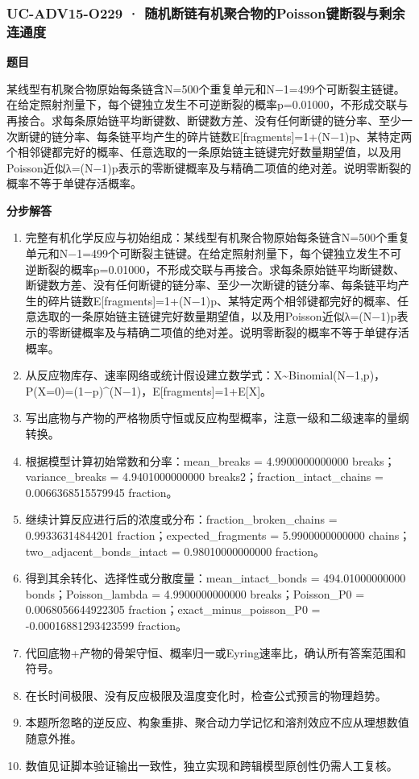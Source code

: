 \documentclass[UTF8,11pt,a4paper]{ctexart}
\begin{document}
\subsubsection*{UC-ADV15-O229 · 随机断链有机聚合物的Poisson键断裂与剩余连通度}
\noindent\textbf{题目}\par
某线型有机聚合物原始每条链含N=500个重复单元和N−1=499个可断裂主链键。在给定照射剂量下，每个键独立发生不可逆断裂的概率p=0.01000，不形成交联与再接合。求每条原始链平均断键数、断键数方差、没有任何断键的链分率、至少一次断键的链分率、每条链平均产生的碎片链数E[fragments]=1+(N−1)p、某特定两个相邻键都完好的概率、任意选取的一条原始链主链键完好数量期望值，以及用Poisson近似λ=(N−1)p表示的零断键概率及与精确二项值的绝对差。说明零断裂的概率不等于单键存活概率。\par
\medskip\noindent\textbf{分步解答}
\begin{enumerate}
\item 完整有机化学反应与初始组成：某线型有机聚合物原始每条链含N=500个重复单元和N−1=499个可断裂主链键。在给定照射剂量下，每个键独立发生不可逆断裂的概率p=0.01000，不形成交联与再接合。求每条原始链平均断键数、断键数方差、没有任何断键的链分率、至少一次断键的链分率、每条链平均产生的碎片链数E[fragments]=1+(N−1)p、某特定两个相邻键都完好的概率、任意选取的一条原始链主链键完好数量期望值，以及用Poisson近似λ=(N−1)p表示的零断键概率及与精确二项值的绝对差。说明零断裂的概率不等于单键存活概率。
\item 从反应物库存、速率网络或统计假设建立数学式：X\textasciitilde{}Binomial(N−1,p)，P(X=0)=(1−p)\textasciicircum{}(N−1)，E[fragments]=1+E[X]。
\item 写出底物与产物的严格物质守恒或反应构型概率，注意一级和二级速率的量纲转换。
\item 根据模型计算初始常数和分率：mean\_breaks = 4.9900000000000 breaks；variance\_breaks = 4.9401000000000 breaks2；fraction\_intact\_chains = 0.0066368515579945 fraction。
\item 继续计算反应进行后的浓度或分布：fraction\_broken\_chains = 0.99336314844201 fraction；expected\_fragments = 5.9900000000000 chains；two\_adjacent\_bonds\_intact = 0.98010000000000 fraction。
\item 得到其余转化、选择性或分散度量：mean\_intact\_bonds = 494.01000000000 bonds；Poisson\_lambda = 4.9900000000000 breaks；Poisson\_P0 = 0.0068056644922305 fraction；exact\_minus\_poisson\_P0 = -0.00016881293423599 fraction。
\item 代回底物+产物的骨架守恒、概率归一或Eyring速率比，确认所有答案范围和符号。
\item 在长时间极限、没有反应极限及温度变化时，检查公式预言的物理趋势。
\item 本题所忽略的逆反应、构象重排、聚合动力学记忆和溶剂效应不应从理想数值随意外推。
\item 数值见证脚本验证输出一致性，独立实现和跨辑模型原创性仍需人工复核。
\end{enumerate}
\end{document}

